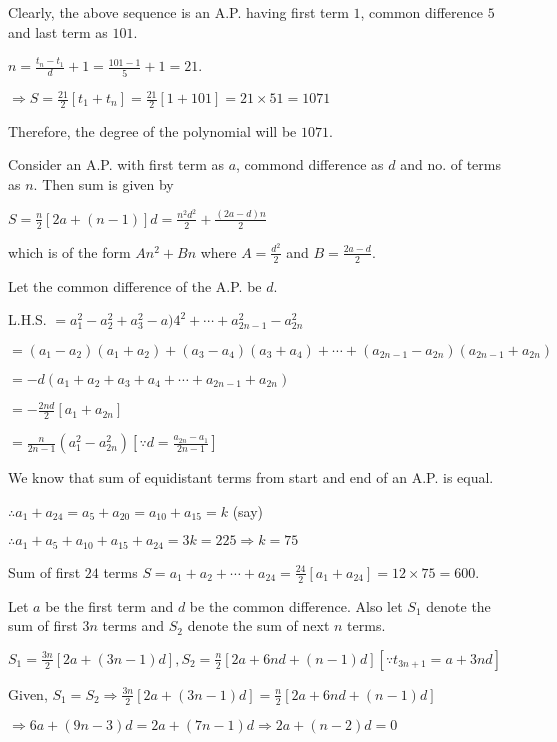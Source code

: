   Clearly, the above sequence is an A.P. having first term $1$, common difference $5$ and last term as $101$.

  $n = \frac{t_n - t_1}{d} + 1 = \frac{101 - 1}{5} + 1 = 21$.

  $\Rightarrow S = \frac{21}{2}[t_1 + t_n] = \frac{21}{2}[1 + 101] = 21\times 51 = 1071$

  Therefore, the degree of the polynomial will be $1071$.
\item Consider an A.P. with first term as $a$, commond difference as $d$ and no. of terms as $n$. Then sum is given by

  $S = \frac{n}{2}[2a + (n - 1)]d = \frac{n^2d^2}{2} + \frac{(2a - d)n}{2}$

  which is of the form $An^2 + Bn$ where $A = \frac{d^2}{2}$ and $B = \frac{2a - d}{2}$.
\item Let the common difference of the A.P. be $d$.

  L.H.S. $= a_1^2 - a_2^2 + a_3^2 - a)4^2 + \cdots + a_{2n - 1}^2 -a_{2n}^2$

  $= (a_1 - a_2)(a_1 + a_2) + (a_3 - a_4)(a_3 + a_4) + \cdots + (a_{2n - 1} - a_{2n})(a_{2n - 1} + a_{2n})$

  $= -d(a_1 + a_2 + a_3 + a_4 + \cdots + a_{2n - 1} + a_{2n})$

  $= -\frac{2nd}{2}[a_1 + a_{2n}]$

  $= \frac{n}{2n - 1}(a_1^2 - a_{2n}^2)\left[\because d = \frac{a_{2n} - a_1}{2n - 1}\right]$
\item We know that sum of equidistant terms from start and end of an A.P. is equal.

  $\therefore a_1 + a_{24} = a_5 + a_{20} = a_{10} + a_{15} = k$ (say)

  $\therefore a_1 + a_5 + a_{10} + a_{15} + a_{24} = 3k = 225 \Rightarrow k = 75$

  Sum of first $24$ terms $S = a_1 + a_2 + \cdots + a_{24} = \frac{24}{2}[a_1 + a_{24}] = 12\times75 = 600$.
\item Let $a$ be the first term and $d$ be the common difference. Also let $S_1$ denote the sum of first $3n$ terms and $S_2$
  denote the sum of next $n$ terms.

  $S_1 = \frac{3n}{2}[2a + (3n - 1)d], S_2 = \frac{n}{2}[2a + 6nd + (n - 1)d][\because t_{3n+1} = a + 3nd]$

  Given, $S_1 = S_2 \Rightarrow \frac{3n}{2}[2a + (3n - 1)d] = \frac{n}{2}[2a + 6nd + (n - 1)d]$

  $\Rightarrow 6a + (9n - 3)d = 2a + (7n - 1)d \Rightarrow 2a + (n - 2)d = 0$

